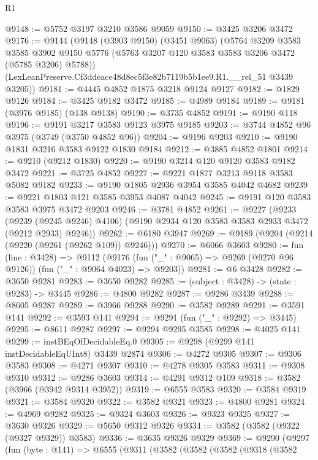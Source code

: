 \begin{lexlean}{R1}
\begin{coremodule}
@9148 := @5752 @3197 @3210 @3586 @9059
@9150 := @3425 @3206 @3472
@9176 := @9144
    (@9148
      (@3903 @9150)
      (@3451 @9063)
      (@5764
        @3209
        @3583
        @3585
        @3902
        @9150
        @5776
        (@5763 @3207 @120 @3583 @3583 @3206 @3472 (@5785 @3206) @5788))
      (LexLeanPreserve.Cf3ddeace48d8ec5f3e82b7119b5b1ee9.R1.__rel_51 @3439 @3205))
@9181 := @4445 @4852 @1875 @3218 @9124 @9127
@9182 := @1829 @9126
@9184 := @3425 @9182 @3472
@9185 := @4989 @9184
@9189 := @9181 (@3976 @9185) (@138 @9138)
@9190 := @3735 @4852
@9191 := @9190 @118
@9196 := @9191 @3217 @3583 @9123 @3975 @9185
@9203 := @3744 @4852 @96 @3975 (@3749 (@3750 @4852 @96))
@9204 := @9196 @9203
@9210 := @9190 @1831 @3216 @3583 @9122 @1830 @9184
@9212 := @3885 @4852 @1801
@9214 := @9210 (@9212 @1830)
@9220 := @9190 @3214 @120 @9120 @3583 @9182 @3472
@9221 := @3725 @4852
@9227 := @9221 @1877 @3213 @9118 @3583 @5082 @9182
@9233 := @9190 @1805 @2936 @3954 @3585 @4042 @4682
@9239 := @9221 @1803 @121 @3585 @3953 @4087 @4042
@9245 := @9191 @120 @3583 @3583 @3975 @3472 @9203
@9246 := @3781 @4852
@9261 := @9227
    (@9233
      (@9239 (@9245 @9246) @4106)
      (@9190 @2934 @120 @3583 @3583 @2933 @3472 (@9212 @2933) @9246))
@9262 := @6180 @3947
@9269 := @9189 (@9204 (@9214 (@9220 (@9261 (@9262 @109)) @9246)))
@9270 := @6066 @3603
@9280 := fun (line : @3428) =>
  @9112 (@9176 (fun ("_" : @9065) => @9269 (@9270 @96 @9126)) (fun ("_" : @9064 @4023) => @9203))
@9281 := @6 @3428
@9282 := @3650 @9281
@9283 := @3650 @9282
@9285 := (subject : @3428) -> (state : @9283) -> @3445
@9286 := @4800 @9282
@9287 := @9286 @3439
@9288 := @8605 @9287
@9289 := @3966 @9288
@9290 := @3582 @9289
@9291 := @3591 @141
@9292 := @3593 @141
@9294 := @9291 (fun ("_" : @9292) => @3445)
@9295 := @8611 @9287
@9297 := @9294 @9295 @3585
@9298 := @4025 @141
@9299 := instBEqOfDecidableEq.{0}
@9305 := @9298 (@9299 @141 instDecidableEqUInt8) @3439 @2874
@9306 := @4272 @9305
@9307 := @9306 @3583
@9308 := @4271 @9307
@9310 := @4278 @9305 @3583
@9311 := @9308 @9310
@9312 := @9286 @3603
@9314 := @4291 @9312 @109
@9318 := @3582 (@3966 (@3942 @9314 @3952))
@9319 := @6555 @3583
@9320 := @3584 @9319
@9321 := @3584 @9320
@9322 := @3582 @9321
@9323 := @4800 @9281
@9324 := @4969 @9282
@9325 := @9324 @3603
@9326 := @9323 @9325
@9327 := @3630 @9326
@9329 := @5650 @9312 @9326
@9334 := @3582 (@3582 (@9322 (@9327 @9329)) @3583)
@9336 := @3635 @9326 @9329
@9369 := @9290
    (@9297
      (fun (byte : @141) =>
      @6555
        (@9311
          (@3582
            (@3582
              (@3582
                (@9318
                  (@3582

\end{coremodule}
\end{lexlean}
